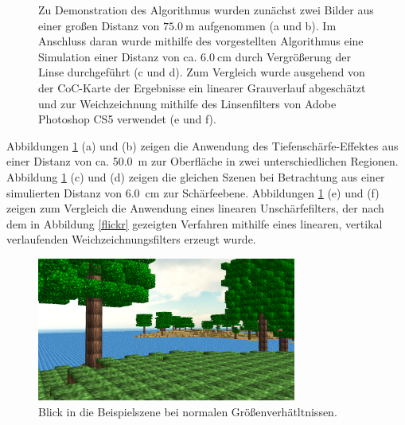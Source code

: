 \documentclass{acmsiggraph}                     %
\begin{document}
\begin{figure}[p]
	\qquad
\caption{Zu Demonstration des Algorithmus wurden zunächst zwei Bilder aus einer großen Distanz von $\SI{75.0}{\meter}$ aufgenommen (a und b). Im Anschluss daran wurde mithilfe des vorgestellten Algorithmus eine Simulation einer Distanz von ca. $\SI{6.0}{\centi\meter}$ durch Vergrößerung der Linse durchgeführt (c und d). Zum Vergleich wurde ausgehend von der CoC-Karte der Ergebnisse ein linearer Grauverlauf abgeschätzt und zur Weichzeichnung mithilfe des Linsenfilters von Adobe Photoshop CS5 verwendet (e und f).}
	\label{abb:res}
\end{figure}

Abbildungen \ref{abb:res} (a) und (b) zeigen die Anwendung des Tiefenschärfe-Effektes aus einer Distanz von ca. \SI{50.0}{\meter} zur Oberfläche in zwei unterschiedlichen Regionen. Abbildung \ref{abb:res} (c) und (d) zeigen die gleichen Szenen bei Betrachtung aus einer simulierten Distanz von \SI{6.0}{\centi\meter} zur Schärfeebene. Abbildungen \ref{abb:res} (e) und (f) zeigen zum Vergleich die Anwendung eines linearen Unschärfefilters, der nach dem in Abbildung \ref{flickr} gezeigten Verfahren mithilfe eines linearen, vertikal verlaufenden Weichzeichnungsfilters erzeugt wurde.

\begin{figure}[htbp]
\centering
\includegraphics[width=3.35in]{Blockcraft-1}
\caption{Blick in die Beispielszene bei normalen Größenverhätltnissen.}
\label{abb:block}
\end{figure}
\end{document}
